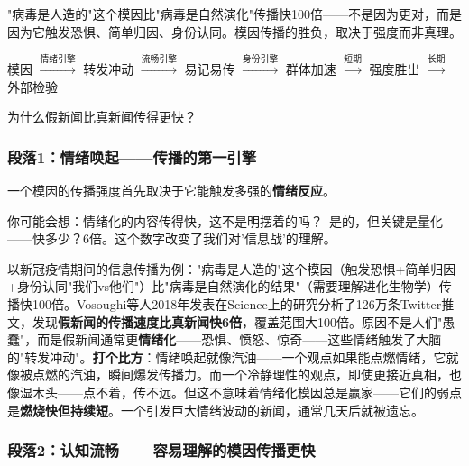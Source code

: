 \documentclass[../main.tex]{subfiles}
\begin{document}
	\begin{motivation}

		"病毒是人造的"这个模因比"病毒是自然演化"传播快100倍——不是因为更对，而是因为它触发恐惧、简单归因、身份认同。模因传播的胜负，取决于强度而非真理。

	\end{motivation}

	\begin{logicmap}

		模因 $\xrightarrow{\text{情绪引擎}}$ 转发冲动 $\xrightarrow{\text{流畅引擎}}$ 易记易传 $\xrightarrow{\text{身份引擎}}$ 群体加速 $\xrightarrow{\text{短期}}$ 强度胜出 $\xrightarrow{\text{长期}}$ 外部检验

	\end{logicmap}

	\begin{questionbox}

		为什么假新闻比真新闻传得更快？

	\end{questionbox}

	\subsubsection*{段落1：情绪唤起——传播的第一引擎}

	一个模因的传播强度首先取决于它能触发多强的\textbf{情绪反应}。

	\begin{tcolorbox}[colback=yellow!5, title=\textit{读者行为预测}]

		你可能会想：情绪化的内容传得快，这不是明摆着的吗？\ 是的，但关键是量化——快多少？6倍。这个数字改变了我们对'信息战'的理解。

	\end{tcolorbox}

以新冠疫情期间的信息传播为例："病毒是人造的"这个模因（触发恐惧+简单归因+身份认同"我们vs他们"）比"病毒是自然演化的结果"（需要理解进化生物学）传播快100倍。Vosoughi等人2018年发表在Science上的研究分析了126万条Twitter推文，发现\textbf{假新闻的传播速度比真新闻快6倍}，覆盖范围大100倍。原因不是人们"愚蠢"，而是假新闻通常更\textbf{情绪化}——恐惧、愤怒、惊奇——这些情绪触发了大脑的"转发冲动"。\textbf{打个比方}：情绪唤起就像汽油——一个观点如果能点燃情绪，它就像被点燃的汽油，瞬间爆发传播力。而一个冷静理性的观点，即使更接近真相，也像湿木头——点不着，传不远。但这不意味着情绪化模因总是赢家——它们的弱点是\textbf{燃烧快但持续短}。一个引发巨大情绪波动的新闻，通常几天后就被遗忘。

	\subsubsection*{段落2：认知流畅——容易理解的模因传播更快}
\end{document}
